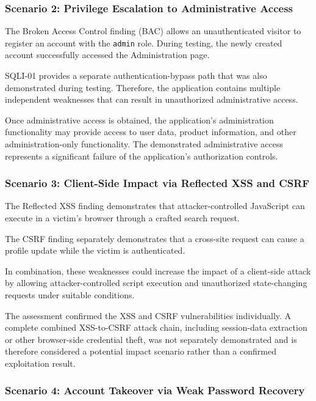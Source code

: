 \subsubsection*{Scenario 2: Privilege Escalation to Administrative Access}

The Broken Access Control finding (BAC) allows an unauthenticated
visitor to register an account with the \texttt{admin} role. During
testing, the newly created account successfully accessed the
Administration page.

SQLI-01 provides a separate authentication-bypass path that was also
demonstrated during testing. Therefore, the application contains
multiple independent weaknesses that can result in unauthorized
administrative access.

Once administrative access is obtained, the application's
administration functionality may provide access to user data,
product information, and other administration-only functionality.
The demonstrated administrative access represents a significant
failure of the application's authorization controls.

\subsubsection*{Scenario 3: Client-Side Impact via Reflected XSS and CSRF}

The Reflected XSS finding demonstrates that attacker-controlled
JavaScript can execute in a victim's browser through a crafted
search request.

The CSRF finding separately demonstrates that a cross-site request
can cause a profile update while the victim is authenticated.

In combination, these weaknesses could increase the impact of a
client-side attack by allowing attacker-controlled script execution
and unauthorized state-changing requests under suitable conditions.

The assessment confirmed the XSS and CSRF vulnerabilities
individually. A complete combined XSS-to-CSRF attack chain, including
session-data extraction or other browser-side credential theft, was
not separately demonstrated and is therefore considered a potential
impact scenario rather than a confirmed exploitation result.

\subsubsection*{Scenario 4: Account Takeover via Weak Password Recovery}

